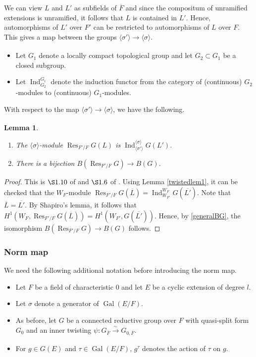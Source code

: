 \documentclass[11pt,a4paper]{article}
\theoremstyle{definition}
\theoremstyle{plain}
\newtheorem{Le}[shared]{Lemma}
\theoremstyle{remark}
\theoremstyle{plain}
\DeclareMathOperator{\Gal}{Gal}
\DeclareMathOperator{\Res}{Res}
\DeclareMathOperator{\Ind}{Ind}
\begin{document}
We can view $L$ and $L'$ as subfields of $\overline{F}$ and since the compositum of unramified extensions is unramified, it follows that $L$ is contained in $L'$. Hence, automorphisms of $L'$ over $F'$ can be restricted to automorphisms of $L$ over $F$. This gives a map between the groups $\langle\sigma'\rangle \xrightarrow[]{} \langle \sigma \rangle$.

\begin{itemize}
    \item Let $G_1$ denote a locally compact topological group and let $G_2 \subset G_1$ be a closed subgroup.
    \item Let $\Ind_{G_2}^{G_1}$ denote the induction functor from the category of (continuous) $G_2$-modules to (continuous) $G_1$-modules.
\end{itemize}

With respect to the map $\langle\sigma'\rangle \xrightarrow[]{} \langle \sigma \rangle$, we have the following.

\begin{Le}\label{Shapiro}
\begin{enumerate}
    \item The $\langle \sigma \rangle$-module $\Res_{F'/F}G(L)$ is $\Ind_{\langle \sigma' \rangle}^{\langle \sigma \rangle} G(L')$.
    \item There is a bijection $B(\Res_{F'/F}G) \xrightarrow[]{} B(G)$.
\end{enumerate}
\end{Le}
\begin{proof}
    This is $\S 1.10$ of \cite{MR809866} and $\S 1.6$ of \cite{MR1485921}. Using Lemma \ref{twistedlem1}, it can be checked that the $W_F$-module $\Res_{F'/F}G(\overline{L}) = \Ind_{W_{F'}}^{W_F} G(\overline{L'})$. Note that $\overline{L} = \overline{L'}$. By Shapiro's lemma, it follows that $H^1(W_F, \Res_{F'/F}G(\overline{L})) = H^1(W_{F'}, G(\overline{L'}))$. Hence, by \ref{generalBG}, the isomorphism $B(\Res_{F'/F}G) \xrightarrow[]{} B(G)$ follows.
\end{proof}

\subsubsection{Norm map}
We need the following additional notation before introducing the norm map.
\begin{itemize}
    \item Let $F$ be a field of characteristic $0$ and let $E$ be a cyclic extension of degree $l$.
    \item Let $\sigma$ denote a generator of $\Gal(E/F)$.
    \item As before, let $G$ be a connected reductive group over $F$ with quasi-split form $G_0$ and an inner twisting $\psi: G_{\overline{F}} \xrightarrow[]{\sim} G_{0,\overline{F}}$.
    \item For $g \in G(E)$ and $\tau \in \Gal(E/F)$, $g^{\tau}$ denotes the action of $\tau$ on $g$.
\end{itemize}
\end{document}
